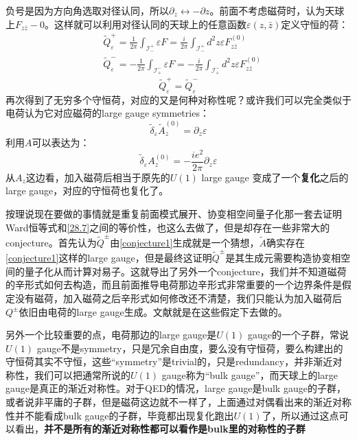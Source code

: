 负号是因为方向角选取对径认同，所以$\partial_z\leftrightarrow-\partial z$。前面不考虑磁荷时，认为天球上$F_{z\bar z}-0$。这样就可以利用对径认同的天球上的任意函数$\varepsilon(z,\bar z)$定义守恒的荷：
\begin{align}
	&\tilde{Q}_{\varepsilon}^{+}=\frac{1}{2\pi}\int_{\mathcal I_{-}^{+}}\varepsilon F=\frac{i}{2\pi}\int_{\mathcal I_{-}^{+}}d^{2}z\varepsilon F_{z\bar{z}}^{(0)}\\
	&\tilde{Q}_{\varepsilon}^{-}=-\frac{1}{2\pi}\int_{\mathcal I_{+}^{-}}\varepsilon F=-\frac{i}{2\pi}\int_{\mathcal I_{+}^{-}}d^{2}z\varepsilon F_{z\bar{z}}^{(0)}
\end{align}
\begin{equation}
	\boxed{
		\tilde{Q}_{\varepsilon}^+=\tilde{Q}_{\varepsilon}^-
	}
\end{equation}
再次得到了无穷多个守恒荷，对应的又是何种对称性呢？或许我们可以完全类似于电荷认为它对应磁荷的large gauge symmetries：
\begin{equation}\label{conjecture1}
	\tilde{\delta}_\varepsilon\tilde{A}_z^{(0)}=\partial_z\varepsilon
\end{equation}
利用$A$可以表达为：
\begin{equation}
	\tilde\delta_{\varepsilon}A_{z}^{(0)}=-\frac{ie^{2}}{2\pi}\partial_{z}\varepsilon 
\end{equation}
从$A_z$这边看，加入磁荷后相当于原先的$U(1)$ large gauge 变成了一个\textbf{复化}之后的large gauge，对应的守恒荷也复化了。

按理说现在要做的事情就是重复前面模式展开、协变相空间量子化那一套去证明Ward恒等式和\ref{28.7}之间的等价性，\cite{Strominger:2015bla}也这么去做了，但是却存在一些非常大的conjecture。首先认为$\tilde{Q}^\pm$由\ref{conjecture1}生成就是一个猜想，$\tilde{A}$确实存在\ref{conjecture1}这样的large gauge，但是最终这证明$\tilde{Q}^\pm$是其生成元需要构造协变相空间的量子化从而计算对易子。这就导出了另外一个conjecture，我们并不知道磁荷的辛形式如何去构造，而且前面推导电荷那边辛形式非常重要的一个边界条件是假定没有磁荷，加入磁荷之后辛形式如何修改还不清楚，我们只能认为加入磁荷后$Q^\pm$依旧由电荷的large gauge生成。文献\cite{Strominger:2015bla}就是在这些假定下去做的。

另外一个比较重要的点，电荷那边的large gauge是$U(1)$ gauge的一个子群，常说$U(1)$ gauge不是symmetry，只是冗余自由度，要么没有守恒荷，要么构建出的守恒荷其实不守恒，这些“symmetry”是trivial的，只是redundancy，并非渐近对称性，我们可以把通常所说的$U(1)$ gauge称为“bulk gauge”，而天球上的large gauge是真正的渐近对称性。对于QED的情况，large gauge是bulk gauge的子群，或者说非平庸的子群，但是磁荷这边就不一样了，上面通过对偶看出来的渐近对称性并不能看成bulk gauge的子群，毕竟都出现复化跑出$U(1)$了，所以通过这点可以看出，\textbf{并不是所有的渐近对称性都可以看作是bulk里的对称性的子群}
